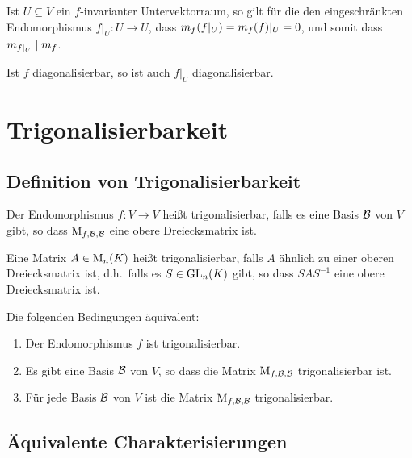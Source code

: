 Ist $U \subseteq V$ ein $f$-invarianter Untervektorraum, so gilt für die den eingeschränkten Endomorphismus $f|_U \colon U \to U$, dass $m_{f}(f|_U) = m_{f}(f)|_U = 0$, und somit dass $m_{f|_U} \mid m_{f}$.

\begin{corollary}
  Ist $f$ diagonalisierbar, so ist auch $f|_U$ diagonalisierbar.
\end{corollary}





\section{Trigonalisierbarkeit}



\subsection{Definition von Trigonalisierbarkeit}

\begin{definition}
  Der Endomorphismus $f \colon V \to V$ heißt trigonalisierbar, falls es eine Basis $\mathcal{B}$ von $V$ gibt, so dass $\operatorname{M}_{f, \mathcal{B}, \mathcal{B}}$ eine obere Dreiecksmatrix ist.
  
  Eine Matrix $A \in \operatorname{M}_{n}(K)$ heißt trigonalisierbar, falls $A$ ähnlich zu einer oberen Dreiecksmatrix ist, d.h.\ falls es $S \in \operatorname{GL}_{n}(K)$ gibt, so dass $S A S^{-1}$ eine obere Dreiecksmatrix ist.
\end{definition}

\begin{lemma}
  Die folgenden Bedingungen äquivalent:
  \begin{enumerate}
    \item
      Der Endomorphismus $f$ ist trigonalisierbar.
    \item
      Es gibt eine Basis $\mathcal{B}$ von $V$, so dass die Matrix $\operatorname{M}_{f, \mathcal{B}, \mathcal{B}}$ trigonalisierbar ist.
    \item
      Für jede Basis $\mathcal{B}$ von $V$ ist die Matrix $\operatorname{M}_{f, \mathcal{B}, \mathcal{B}}$ trigonalisierbar.
  \end{enumerate}
\end{lemma}



\subsection{Äquivalente Charakterisierungen}

